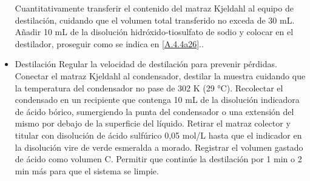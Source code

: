 \begin{itemize}
	\subitem Cuantitativamente transferir el contenido del matraz Kjeldahl al equipo de destilación, cuidando que el volumen total transferido no exceda de 30 mL.\label{A.4.3.4a26}
	\subitem Añadir 10 mL de la disolución hidróxido-tiosulfato de sodio y colocar en el destilador, proseguir como se indica en \ref{A.4.4a26}.\label{A.4.3.5a26}.
	\item Destilación\label{A.4.4a26}
	\subitem Regular la velocidad de destilación para prevenir pérdidas.\label{A.4.4.1a26}
	\subitem Conectar el matraz Kjeldahl al condensador, destilar la muestra cuidando que la temperatura del condensador no pase de 302 K (29 °C).\label{A.4.4.2a26}
	\subitem Recolectar el condensado en un recipiente que contenga 10 mL de la disolución indicadora de ácido bórico, sumergiendo la punta del condensador o una extensión del mismo por debajo de la superficie del líquido.\label{A.4.4.3a26}
	\subitem Retirar el matraz colector y titular con disolución de ácido sulfúrico 0,05 mol/L hasta que el indicador en la disolución vire de verde esmeralda a morado. Registrar el volumen gastado de ácido como volumen C.\label{A.4.4.4a26}
	\subitem Permitir que continúe la destilación por 1 min o 2 min más para que el sistema se limpie.\label{A.4.4.5a26}
\end{itemize}